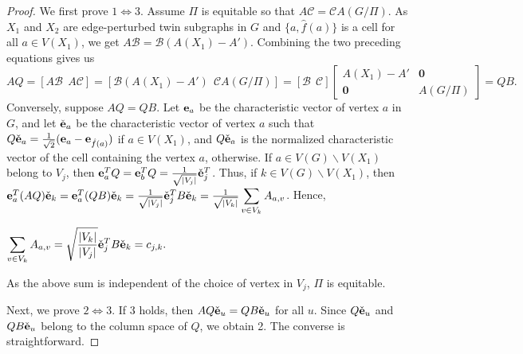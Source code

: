 \documentclass[10pt,a4paper]{amsart}
\def \e {{\bf e}}
\begin{document}
\begin{proof}
We first prove $1\Leftrightarrow 3$. Assume $\Pi$ is equitable so that $A\mathcal{C}=\mathcal{C}A(G/\Pi)$. As $X_1$ and $X_2$ are edge-perturbed twin subgraphs in $G$ and $\{a,\hat{f}(a)\}$ is a cell for all $a\in V (X_1)$, we get $A\mathcal{B}=\mathcal{B}(A(X_1)-A')$. Combining the two preceding equations gives us
\begin{equation*}
AQ=[A\mathcal{B}~~A\mathcal{C}]=[\mathcal{B}(A(X_1)-A')~~\mathcal{C}A(G/\Pi)]=[\mathcal{B}~~\mathcal{C}]\begin{bmatrix}
     A(X_1)-A' & \mathbf{0}\\
     \mathbf{0} & A(G/\Pi)
     \end{bmatrix}=QB.
\end{equation*}
Conversely, suppose $AQ=QB$. %
Let $\e_a$ be the characteristic vector of vertex $a$ in $G$, and let $\check{\e}_a$ be the characteristic vector of vertex $a$ such that $Q\check{\e}_a=\frac{1}{\sqrt{2}}(\e_a-\e_{\hat{f}(a)})$ if $a\in V(X_1)$, and $Q\check{\e}_a$ is the normalized characteristic vector of the cell containing the vertex $a$, otherwise. If $a\in V(G)\backslash V(X_1)$ belong to $V_j$, then $\e_a^TQ=\e_b^TQ=\frac{1}{\sqrt{|V_j|}}\check{\e}_j^T$. Thus, if $k\in V(G)\backslash V(X_1)$, then 
$\e_a^T(AQ)\check{\e}_k=\e_a^T(QB)\check{\e}_k=\frac{1}{\sqrt{|V_j|}}\check{\e}_j^TB\check{\e}_k=\frac{1}{\sqrt{|V_k|}}\displaystyle\sum_{v\in V_k}A_{a,v}$. Hence,
\begin{center}
$\displaystyle\sum_{v\in V_k}A_{a,v}= \sqrt\frac{|V_k|}{|V_j|}\check{\e}_j^TB\check{\e}_k=c_{j,k}.$
\end{center}
As the above sum is independent of the choice of vertex in $V_j$, $\Pi$ is equitable. %


Next, we prove $2\Leftrightarrow 3$. If 3 holds, then $AQ\check{\e}_u=QB\check{\e}_u$ for all $u$. Since $Q\check{\e}_u$ and $QB\check{\e}_u$ belong to the column space of $Q$, we obtain 2. The converse is straightforward.


\end{proof}
\end{document}
